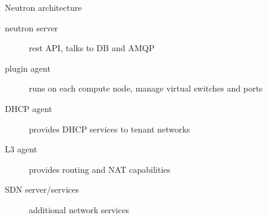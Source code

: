 \documentclass[english,serif,mathserif,xcolor=pdftex,dvipsnames,table]{beamer}
\begin{document}
\begin{frame}
  {Neutron architecture}
  \begin{description}
  \item[neutron server] rest API, talks to DB and AMQP
  \item[plugin agent] runs on each compute node, manage virtual
    switches and ports
  \item[DHCP agent] provides DHCP services to tenant networks
  \item[L3 agent] provides routing and NAT capabilities
  \item[SDN server/services] additional network services
  \end{description}
\end{frame}


%
%
%
%
%
%
%
%
%
\end{document}
